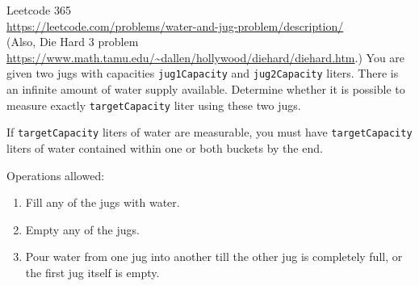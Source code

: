  Leetcode 365 \\
  \url{https://leetcode.com/problems/water-and-jug-problem/description/} \\
  (Also, Die Hard 3 problem
  \url{https://www.math.tamu.edu/~dallen/hollywood/diehard/diehard.htm}.)
  You are given two jugs with capacities \verb!jug1Capacity! and
  \verb!jug2Capacity! liters.
  There is an infinite amount of water supply available.
  Determine whether it is possible to measure exactly \verb!targetCapacity!
  liter using these two jugs.

  If \verb!targetCapacity! liters of water are measurable,
  you must have \verb!targetCapacity! liters of water contained within one or
  both buckets by the end.

  Operations allowed:
  \begin{enumerate}[nosep]
    \item Fill any of the jugs with water.
    \item Empty any of the jugs.
    \item Pour water from one jug into another till the other jug is completely
      full, or the first jug itself is empty.
  \end{enumerate}
  
